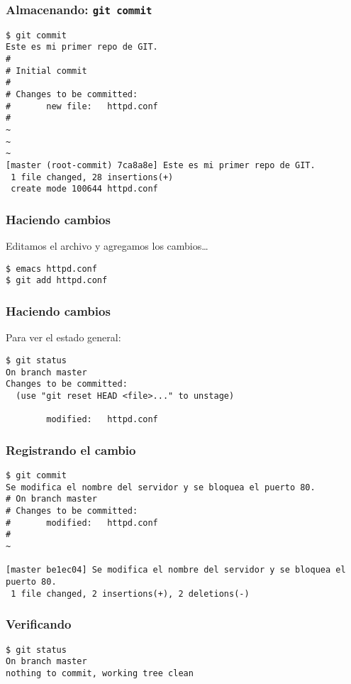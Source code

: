 \documentclass{beamer}
\begin{document}
\begin{frame}[fragile]
  \frametitle{Almacenando: \texttt{git commit}}
\begin{verbatim}
$ git commit
Este es mi primer repo de GIT.
#
# Initial commit
#
# Changes to be committed:
#       new file:   httpd.conf
#
~
~
~
[master (root-commit) 7ca8a8e] Este es mi primer repo de GIT.
 1 file changed, 28 insertions(+)
 create mode 100644 httpd.conf
\end{verbatim}
\end{frame}

\begin{frame}[fragile]
  \frametitle{Haciendo cambios}
  Editamos el archivo y agregamos los cambios\ldots{}
\begin{verbatim}
$ emacs httpd.conf
$ git add httpd.conf
\end{verbatim}
\end{frame}

\begin{frame}[fragile]
  \frametitle{Haciendo cambios}
  Para ver el estado general:
\begin{verbatim}
$ git status        
On branch master
Changes to be committed:
  (use "git reset HEAD <file>..." to unstage)

        modified:   httpd.conf
\end{verbatim}
\end{frame}

\begin{frame}[fragile]
  \frametitle{Registrando el cambio}
\begin{verbatim}
$ git commit
Se modifica el nombre del servidor y se bloquea el puerto 80.
# On branch master
# Changes to be committed:
#       modified:   httpd.conf
#
~

[master be1ec04] Se modifica el nombre del servidor y se bloquea el puerto 80.
 1 file changed, 2 insertions(+), 2 deletions(-)
\end{verbatim}
\end{frame}

\begin{frame}[fragile]
  \frametitle{Verificando}
\begin{verbatim}
$ git status 
On branch master
nothing to commit, working tree clean

\end{verbatim}
\end{frame}

\end{document}
